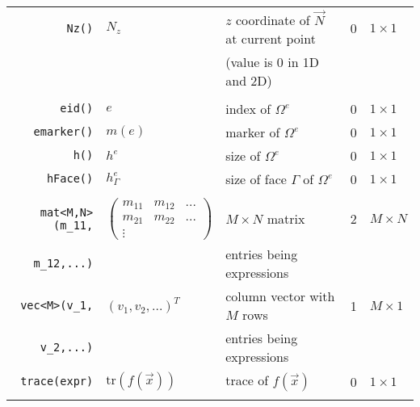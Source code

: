 \begin{longtable}[c]{rllll}
  \lstinline!Nz()! & $N_z$ & $z$ coordinate of $\overrightarrow{N}$ at current point& 0 & $1 \times 1$\\
  & &  (value is 0 in 1D and 2D)  & &\\\hline\\

  \lstinline!eid()! & $e$ & index of  $\Omega^e$ & 0 & $1 \times 1$\\
  \lstinline!emarker()! & $m(e)$ & marker of  $\Omega^e$ & 0 & $1 \times 1$\\
  \lstinline!h()! & $h^e$ & size of   $\Omega^e$ & 0 & $1 \times 1$\\
  \lstinline!hFace()! & $h^e_{\Gamma}$ & size of face $\Gamma$ of $\Omega^e$ & 0 & $1 \times 1$\\\hline\\

  \lstinline!mat<M,N>(m_11,! &
  $\begin{pmatrix}
    m_{11} & m_{12} & ...\\
    m_{21} & m_{22} & ...\\
    \vdots & &
  \end{pmatrix}$
  & $M\times N$ matrix    & 2 & $M \times N$\\
  \lstinline!m_12,...)!& & entries being expressions   & &\\

  \lstinline!vec<M>(v_1,! &$(v_1, v_2,...)^T$
  & column vector with $M$ rows    & 1 & $M \times 1$\\
  \lstinline!v_2,...)!& & entries being expressions   & &\\

  \lstinline!trace(expr)! &$\mathrm{tr}(f(\overrightarrow{x}))$  & trace of $f(\overrightarrow{x})$   & 0 & $1 \times 1$\\\hline\\




\end{longtable}
